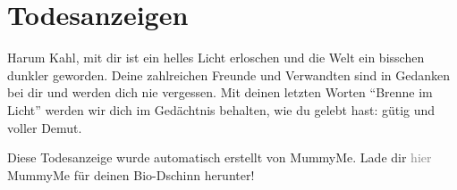 \documentclass[final]{multiversum}
\begin{document}
\section{Todesanzeigen}


Harum Kahl, mit dir ist ein helles Licht erloschen und die Welt ein bisschen dunkler geworden.
Deine zahlreichen Freunde und Verwandten sind in Gedanken bei dir und werden dich nie vergessen.
Mit deinen letzten Worten \enquote{Brenne im Licht} werden wir dich im Gedächtnis behalten, wie du gelebt hast: gütig und voller Demut.

Diese Todesanzeige wurde automatisch erstellt von MummyMe.
Lade dir \textcolor{gray}{hier} MummyMe für deinen Bio-Dschinn herunter!



\end{document}
